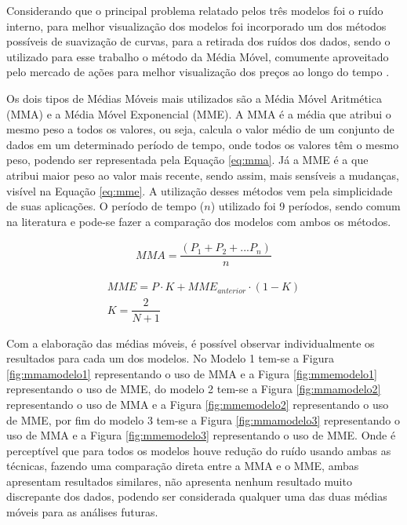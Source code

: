 \documentclass[acronym,symbols,table]{fei}
\begin{document}
Considerando que o principal problema relatado pelos três modelos foi o ruído interno, para melhor visualização dos modelos foi incorporado um dos métodos possíveis de suavização de curvas, para a retirada dos ruídos dos dados, sendo o utilizado para esse trabalho o método da Média Móvel, comumente aproveitado pelo mercado de ações para melhor visualização dos preços ao longo do tempo \cite{mm}.

Os dois tipos de Médias Móveis mais utilizados são a Média Móvel Aritmética (MMA) e a Média Móvel Exponencial (MME). A MMA é a média que atribui o mesmo peso a todos os valores, ou seja, calcula o valor médio de um conjunto de dados em um determinado período de tempo, onde todos os valores têm o mesmo peso, podendo ser representada pela Equação \ref{eq:mma}. Já a MME é a que atribui maior peso ao valor mais recente, sendo assim, mais sensíveis a mudanças, visível na Equação \ref{eq:mme}. A utilização desses métodos vem pela simplicidade de suas aplicações. O período de tempo ($n$) utilizado foi 9 períodos, sendo comum na literatura \cite{bisi2009estrategias} e pode-se fazer a comparação dos modelos com ambos os métodos.

\begin{equation} \label{eq:mma}
    \begin{aligned}
{MMA}= \dfrac{({P_1} + {P_2} + ... {P_n})}{n}
    \end{aligned}
\end{equation}

\begin{equation} \label{eq:mme}
    \begin{aligned}
    {MME}  = {P} \cdot {K} + {MME}_{anterior} \cdot ({1} - {K})\\
    {K} = \dfrac{{2}}{N+1}
    \end{aligned}
\end{equation}

Com a elaboração das médias móveis, é possível observar individualmente os resultados para cada um dos modelos. No Modelo 1 tem-se a Figura \ref{fig:mmamodelo1} representando o uso de MMA e a Figura \ref{fig:mmemodelo1} representando o uso de MME, do modelo 2 tem-se a Figura \ref{fig:mmamodelo2} representando o uso de MMA e a Figura \ref{fig:mmemodelo2} representando o uso de MME, por fim do modelo 3 tem-se a Figura \ref{fig:mmamodelo3} representando o uso de MMA e a Figura \ref{fig:mmemodelo3} representando o uso de MME. Onde é perceptível que para todos os modelos houve redução do ruído usando ambas as técnicas, fazendo uma comparação direta entre a MMA e o MME, ambas apresentam resultados similares, não apresenta nenhum resultado muito discrepante dos dados, podendo ser considerada qualquer uma das duas médias móveis para as análises futuras. 
\end{document}
